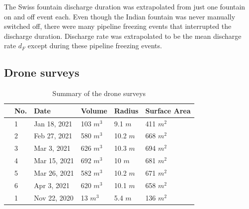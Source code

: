 \documentclass[utf8]{frontiersSCNS}
\begin{document}
The Swiss fountain discharge duration was extrapolated from just one fountain on and off event each. Even though
the Indian fountain was never manually switched off, there were many pipeline freezing events that interrupted
the discharge duration. Discharge rate was extrapolated to be the mean discharge rate $d_F$ except during these
pipeline freezing events.

\subsection{Drone surveys}

\begin{table}
	\centering
	\caption{ Summary of the drone surveys}
	\label{tab:uav}
	\begin{tabular}{@{}|llllll|@{}}
		\toprule
		\textbf{}              & \textbf{No.} & \textbf{Date} & \textbf{Volume} & \textbf{Radius} & \textbf{Surface Area} \\ \midrule
		\multicolumn{1}{|l|}{\multirow{6}{*}{\rotatebox[origin=c]{90}{IN21}}}
		                       & 1            & Jan 18, 2021  & 103 $m^{3}$     & 9.1 $m$
		                       & 411 $m^{2}$                                                                      \\
		\multicolumn{1}{|l|}{} & 2            & Feb 27, 2021  & 580 $m^{3}$     & 10.2 $m$
		                       & 668 $m^{2}$                                                                      \\
		\multicolumn{1}{|l|}{} & 3            & Mar 3, 2021   & 626 $m^{3}$     & 10.3 $m$
		                       & 694 $m^{2}$                                                                      \\
		\multicolumn{1}{|l|}{} & 4            & Mar 15, 2021  & 692 $m^{3}$     & 10 $m$
		                       & 681 $m^{2}$                                                                      \\
		\multicolumn{1}{|l|}{} & 5            & Mar 26, 2021  & 582 $m^{3}$     & 10.2 $m$
		                       & 671 $m^{2}$                                                                      \\
		\multicolumn{1}{|l|}{} & 6            & Apr 3, 2021   & 620 $m^{3}$     & 10.1 $m$
		                       & 658 $m^{2}$
		\\\midrule
		\multicolumn{1}{|l|}{\multirow{8}{*}{\rotatebox[origin=c]{90}{CH21}}}
		                       & 1            & Nov 22, 2020  & 13 $m^{3}$      & 5.4 $m$
		                       & 136 $m^{2}$                                                                       \\

\end{tabular}
\end{table}
\end{document}

